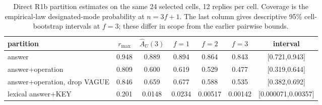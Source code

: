 \begin{table}[htbp]\centering\small
\caption{Direct R1b partition estimates on the same 24 selected cells, 12 replies per
cell. Coverage is the empirical-law designated-mode probability at $n=3f+1$.
The last column gives descriptive 95\% cell-bootstrap intervals at $f=3$;
these differ in scope from the earlier pairwise bounds.}
\label{tab:r1b-partitions}
\begin{tabular}{lcccccc}\toprule
partition & $r_{\max}$ & $\widehat A_U(3)$ & $f=1$ & $f=2$ & $f=3$ & interval\\\midrule
answer & 0.948 & 0.889 & 0.894 & 0.864 & 0.843 & [0.721,0.943]\\
answer+operation & 0.809 & 0.600 & 0.619 & 0.529 & 0.477 & [0.319,0.644]\\
answer+operation, drop VAGUE & 0.846 & 0.659 & 0.677 & 0.588 & 0.535 & [0.382,0.692]\\
lexical answer+KEY & 0.201 & 0.0148 & 0.0234 & 0.00517 & 0.00142 & [0.000071,0.00357]\\
\bottomrule\end{tabular}
\end{table}
